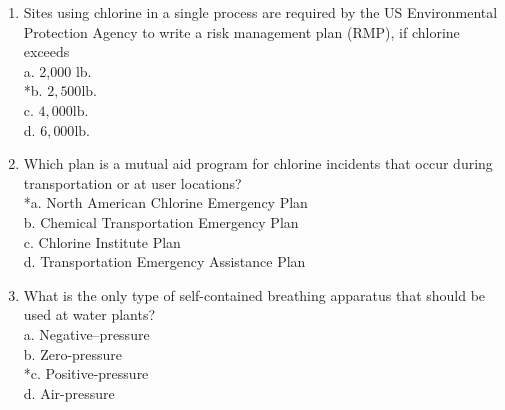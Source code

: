 \begin{enumerate}[1.]
\item Sites using chlorine in a single process are required by the US Environmental Protection Agency to write a risk management plan (RMP), if chlorine exceeds\\
a. 2,000 lb.\\
*b. $2,500 \mathrm{lb}$.\\
c. $4,000 \mathrm{lb}$.\\
d. $6,000 \mathrm{lb}$.\\
\item Which plan is a mutual aid program for chlorine incidents that occur during transportation or at user locations?\\
*a. North American Chlorine Emergency Plan\\
b. Chemical Transportation Emergency Plan\\
c. Chlorine Institute Plan\\
d. Transportation Emergency Assistance Plan\\
\item What is the only type of self-contained breathing apparatus that should be used at water plants?\\
a.	Negative--pressure\\
b.	Zero-pressure\\
*c.	Positive-pressure\\
d.	Air-pressure\\
\end{enumerate}



